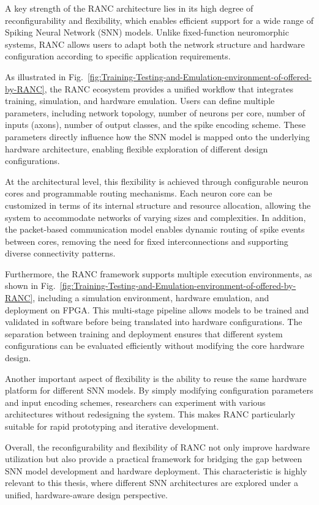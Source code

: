 \documentclass[../main.tex]{subfiles}
\begin{document}
A key strength of the RANC\cite{RANC} architecture lies in its high degree of reconfigurability and flexibility, which enables efficient support for a wide range of Spiking Neural Network (SNN) models. Unlike fixed-function neuromorphic systems, RANC\cite{RANC} allows users to adapt both the network structure and hardware configuration according to specific application requirements.

As illustrated in Fig.~\ref{fig:Training-Testing-and-Emulation-environment-of-offered-by-RANC}, the RANC\cite{RANC} ecosystem provides a unified workflow that integrates training, simulation, and hardware emulation. Users can define multiple parameters, including network topology, number of neurons per core, number of inputs (axons), number of output classes, and the spike encoding scheme. These parameters directly influence how the SNN model is mapped onto the underlying hardware architecture, enabling flexible exploration of different design configurations.

At the architectural level, this flexibility is achieved through configurable neuron cores and programmable routing mechanisms. Each neuron core can be customized in terms of its internal structure and resource allocation, allowing the system to accommodate networks of varying sizes and complexities. In addition, the packet-based communication model enables dynamic routing of spike events between cores, removing the need for fixed interconnections and supporting diverse connectivity patterns.

Furthermore, the RANC\cite{RANC} framework supports multiple execution environments, as shown in Fig.~\ref{fig:Training-Testing-and-Emulation-environment-of-offered-by-RANC}, including a simulation environment, hardware emulation, and deployment on FPGA. This multi-stage pipeline allows models to be trained and validated in software before being translated into hardware configurations. The separation between training and deployment ensures that different system configurations can be evaluated efficiently without modifying the core hardware design.

Another important aspect of flexibility is the ability to reuse the same hardware platform for different SNN models. By simply modifying configuration parameters and input encoding schemes, researchers can experiment with various architectures without redesigning the system. This makes RANC\cite{RANC} particularly suitable for rapid prototyping and iterative development.

Overall, the reconfigurability and flexibility of RANC\cite{RANC} not only improve hardware utilization but also provide a practical framework for bridging the gap between SNN model development and hardware deployment. This characteristic is highly relevant to this thesis, where different SNN architectures are explored under a unified, hardware-aware design perspective.
\end{document}
